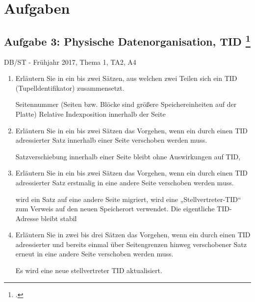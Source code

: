 \documentclass{lehramt-informatik}
\begin{document}

\chapter{Aufgaben}

\section{Aufgabe 3: Physische Datenorganisation, TID
\footcite{db:pu:3}}

DB/ST - Frühjahr 2017, Thema 1, TA2, A4

\begin{enumerate}
\item Erläutern Sie in ein bis zwei Sätzen, aus welchen zwei Teilen
sich ein TID (Tupelldentifikator) zusammensetzt.

\begin{antwort}
Seitennummer (Seiten bzw. Blöcke sind größere Speichereinheiten auf der
Platte) Relative Indexposition innerhalb der Seite
\end{antwort}

\item Erläutern Sie in ein bis zwei Sätzen das Vorgehen, wenn ein
durch einen TID adressierter Satz innerhalb einer Seite verschoben
werden muss.

\begin{antwort}
Satzverschiebung innerhalb einer Seite bleibt ohne Auswirkungen auf TID,
\end{antwort}

\item Erläutern Sie in ein bis zwei Sätzen das Vorgehen, wenn ein
durch einen TID adressierter Satz erstmalig in eine andere Seite
verschoben werden muss.

\begin{antwort}
wird ein Satz auf eine andere Seite migriert, wird eine
„Stellvertreter-TID“ zum Verweis auf den neuen Speicherort verwendet.
Die eigentliche TID-Adresse bleibt stabil
\end{antwort}

\item Erläutern Sie in zwei bis drei Sätzen das Vorgehen, wenn ein
durch einen TID adressierter und bereits einmal über Seitengrenzen
hinweg verschobener Satz erneut in eine andere Seite verschoben werden
muss.

\begin{antwort}
Es wird eine neue stellvertreter TID aktualisiert.
\end{antwort}

\end{enumerate}

\literatur
\end{document}
